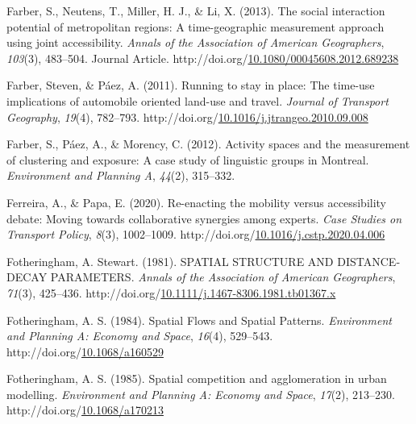 \documentclass[
11pt, %
oneside, %
english, %
singlespacing, %
]{macthesis} %
\newlength{\cslhangindent}
\newenvironment{CSLReferences}[2] %
{\begin{list}{}{%
	\setlength{\itemindent}{0pt}
	\setlength{\leftmargin}{0pt}
	\setlength{\parsep}{0pt}
	\ifodd #1
	\setlength{\leftmargin}{\cslhangindent}
	\setlength{\itemindent}{-1\cslhangindent}
	\fi
	\setlength{\itemsep}{#2\baselineskip}}}
{\end{list}}
\begin{document}
\begin{CSLReferences}{1}{0}
Farber, S., Neutens, T., Miller, H. J., \& Li, X. (2013). The social interaction potential of metropolitan regions: A time-geographic measurement approach using joint accessibility. \emph{Annals of the Association of American Geographers}, \emph{103}(3), 483--504. Journal Article. http://doi.org/\href{https://doi.org/10.1080/00045608.2012.689238}{10.1080/00045608.2012.689238}

Farber, Steven, \& Páez, A. (2011). Running to stay in place: The time-use implications of automobile oriented land-use and travel. \emph{Journal of Transport Geography}, \emph{19}(4), 782--793. http://doi.org/\href{https://doi.org/10.1016/j.jtrangeo.2010.09.008}{10.1016/j.jtrangeo.2010.09.008}

Farber, S., Páez, A., \& Morency, C. (2012). Activity spaces and the measurement of clustering and exposure: A case study of linguistic groups in {Montreal}. \emph{Environment and Planning A}, \emph{44}(2), 315--332.

Ferreira, A., \& Papa, E. (2020). Re-enacting the mobility versus accessibility debate: Moving towards collaborative synergies among experts. \emph{Case Studies on Transport Policy}, \emph{8}(3), 1002--1009. http://doi.org/\href{https://doi.org/10.1016/j.cstp.2020.04.006}{10.1016/j.cstp.2020.04.006}

Fotheringham, A. Stewart. (1981). {SPATIAL} {STRUCTURE} {AND} {DISTANCE}‐{DECAY} {PARAMETERS}. \emph{Annals of the Association of American Geographers}, \emph{71}(3), 425--436. http://doi.org/\href{https://doi.org/10.1111/j.1467-8306.1981.tb01367.x}{10.1111/j.1467-8306.1981.tb01367.x}

Fotheringham, A. S. (1984). Spatial {Flows} and {Spatial} {Patterns}. \emph{Environment and Planning A: Economy and Space}, \emph{16}(4), 529--543. http://doi.org/\href{https://doi.org/10.1068/a160529}{10.1068/a160529}

Fotheringham, A. S. (1985). Spatial competition and agglomeration in urban modelling. \emph{Environment and Planning A: Economy and Space}, \emph{17}(2), 213--230. http://doi.org/\href{https://doi.org/10.1068/a170213}{10.1068/a170213}


\end{CSLReferences}
\end{document}
